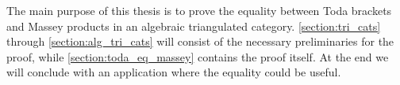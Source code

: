 The main purpose of this thesis is to prove the equality between Toda brackets and Massey products in an algebraic triangulated category. \autoref{section:tri_cats} through \autoref{section:alg_tri_cats} will consist of the necessary preliminaries for the proof, while \autoref{section:toda_eq_massey} contains the proof itself. At the end we will conclude with an application where the equality could be useful.
